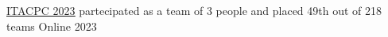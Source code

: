 

\begin{cvhonors}

  \cvhonor
    {\underline{\href{https://itacpc.it/competition/results/2023}{ITACPC 2023}}} %
    {partecipated as a team of 3 people and placed 49th out of 218 teams} %
    {Online} %
    {2023} %

\end{cvhonors}
